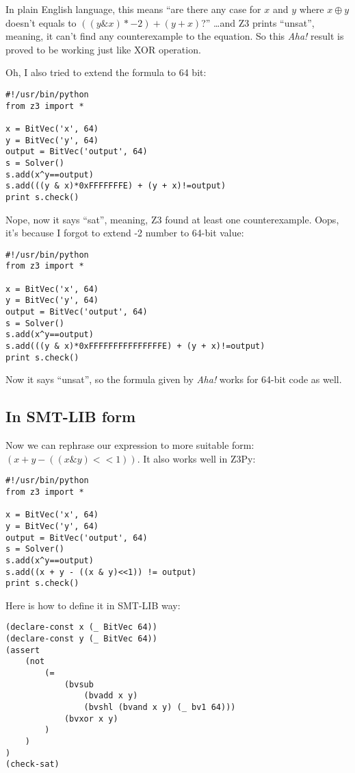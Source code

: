 In plain English language, this means
``are there any case for $x$ and $y$ where $x \oplus y$ doesn't equals to $((y \& x)*-2) + (y + x)$?''
\dots and Z3 prints ``unsat'', meaning, it can't find any counterexample to the equation.
So this \emph{Aha!} result is proved to be working just like XOR operation.

Oh, I also tried to extend the formula to 64 bit:

\begin{lstlisting}
#!/usr/bin/python
from z3 import *

x = BitVec('x', 64)
y = BitVec('y', 64)
output = BitVec('output', 64)
s = Solver()
s.add(x^y==output)
s.add(((y & x)*0xFFFFFFFE) + (y + x)!=output)
print s.check()
\end{lstlisting}

Nope, now it says ``sat'', meaning, Z3 found at least one counterexample.
Oops, it's because I forgot to extend -2 number to 64-bit value:

\begin{lstlisting}
#!/usr/bin/python
from z3 import *

x = BitVec('x', 64)
y = BitVec('y', 64)
output = BitVec('output', 64)
s = Solver()
s.add(x^y==output)
s.add(((y & x)*0xFFFFFFFFFFFFFFFE) + (y + x)!=output)
print s.check()
\end{lstlisting}

Now it says ``unsat'', so the formula given by \emph{Aha!} works for 64-bit code as well.

\subsection{In SMT-LIB form}

Now we can rephrase our expression to more suitable form: $(x + y - ((x \& y)<<1))$.
It also works well in Z3Py:

\begin{lstlisting}
#!/usr/bin/python
from z3 import *

x = BitVec('x', 64)
y = BitVec('y', 64)
output = BitVec('output', 64)
s = Solver()
s.add(x^y==output)
s.add((x + y - ((x & y)<<1)) != output)
print s.check()
\end{lstlisting}

Here is how to define it in SMT-LIB way:

\begin{lstlisting}
(declare-const x (_ BitVec 64))
(declare-const y (_ BitVec 64))
(assert 
	(not
		(=
			(bvsub
				(bvadd x y)
				(bvshl (bvand x y) (_ bv1 64)))
			(bvxor x y)
		)
	)
)
(check-sat)
\end{lstlisting}

